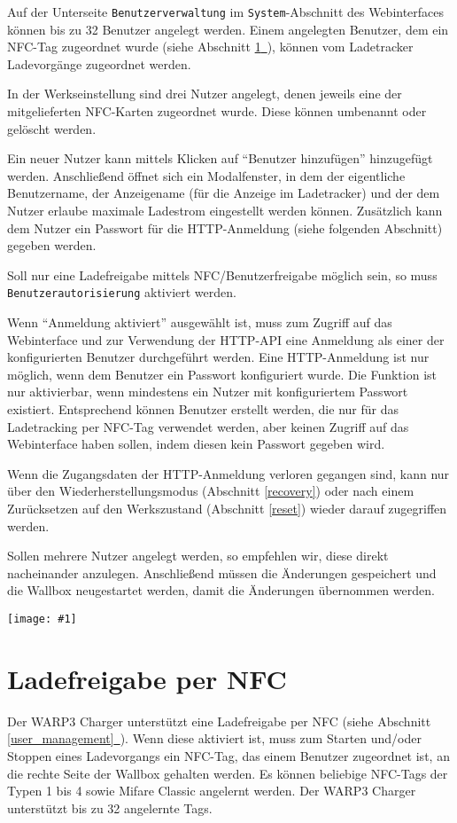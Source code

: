 \documentclass[a4paper,10pt]{article}
\newcommand{\hint}[1]{\begin{tcolorbox}[colback=boxgray,colframe=black,coltext=
white,title=Hinweis,left*=2mm,right*=2mm,boxsep=1mm,bottom=1mm,top=1mm]#1\end{tcolorbox}}
\newcommand{\gfx}[1]{\texttt{[image: \#1]}}
\newcommand*{\fullref}[1]{Abschnitt \hyperref[{#1}]{\ref*{#1}~\nameref*{#1}}}
\begin{document}
\begin{multicols*}{2}
    Auf der Unterseite \texttt{Benutzerverwaltung} im \texttt{System}-Abschnitt des Webinterfaces können bis zu 32 Benutzer angelegt werden.
    Einem angelegten Benutzer, dem ein NFC-Tag zugeordnet wurde (siehe \fullref{NFC}), können vom Ladetracker Ladevorgänge zugeordnet werden.

    In der Werkseinstellung sind drei Nutzer angelegt,
    denen jeweils eine der mitgelieferten NFC-Karten zugeordnet wurde. Diese können
    umbenannt oder gelöscht werden.

    Ein neuer Nutzer kann mittels Klicken auf \enquote{Benutzer hinzufügen} hinzugefügt werden.
    Anschließend öffnet sich ein Modalfenster, in dem der eigentliche Benutzername, der Anzeigename (für die Anzeige im Ladetracker)
    und der dem Nutzer erlaube maximale Ladestrom eingestellt werden können.
    Zusätzlich kann dem Nutzer ein Passwort für die HTTP-Anmeldung (siehe
    folgenden Abschnitt) gegeben werden.

    Soll nur eine Ladefreigabe mittels NFC/Benutzerfreigabe möglich sein, so
    muss \texttt{Benutzerautorisierung} aktiviert werden.

    Wenn \enquote{Anmeldung aktiviert} ausgewählt ist, muss zum Zugriff auf das Webinterface und zur Verwendung
    der HTTP-API eine Anmeldung als einer der konfigurierten Benutzer durchgeführt werden. Eine HTTP-Anmeldung ist nur möglich, wenn
    dem Benutzer ein Passwort konfiguriert wurde. Die Funktion ist nur aktivierbar, wenn mindestens ein Nutzer mit konfiguriertem Passwort existiert. Entsprechend können Benutzer erstellt werden, die nur für das Ladetracking per NFC-Tag
    verwendet werden, aber keinen Zugriff auf das Webinterface haben sollen,
	indem diesen kein Passwort gegeben wird.
    \hint{Wenn die Zugangsdaten der HTTP-Anmeldung verloren gegangen sind, kann nur
    über den Wiederherstellungsmodus (Abschnitt \ref{recovery}) oder nach einem
    Zurücksetzen auf den Werkszustand (Abschnitt \ref{reset}) wieder darauf zugegriffen werden.}

    Sollen mehrere Nutzer angelegt werden, so empfehlen wir, diese direkt
    nacheinander anzulegen. Anschließend müssen die Änderungen gespeichert und
    die Wallbox neugestartet werden, damit die Änderungen übernommen werden.

    \gfx{./img_warp3/resized/web_users}

    \newpage
    \section{Ladefreigabe per NFC}
    \label{NFC}
    Der WARP3 Charger unterstützt eine Ladefreigabe per NFC (siehe \fullref{user_management}).
    Wenn diese aktiviert ist,
    muss zum Starten und/oder Stoppen eines Ladevorgangs ein NFC-Tag, das einem Benutzer zugeordnet ist, an die rechte Seite
    der Wallbox gehalten werden. Es können beliebige NFC-Tags der Typen 1 bis 4
    sowie Mifare Classic angelernt werden. Der WARP3 Charger unterstützt bis zu 32 angelernte Tags.


\end{multicols*}
\end{document}
